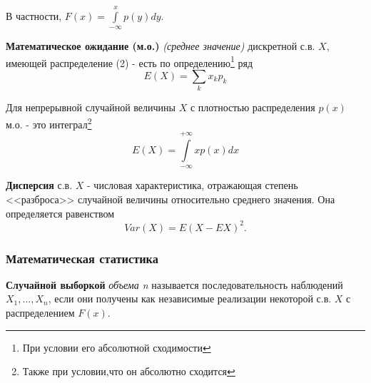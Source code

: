 \documentclass{article}
\begin{document}
      В частности, $F(x) = \int\limits_{-\infty}^x p(y)dy$.  
     
      \textbf{Математическое ожидание (м.о.)} \textsl{(среднее значение)} дискретной с.в. $X$, имеющей распределение (2) - есть по определению\footnote{При условии его абсолютной сходимости} ряд
      \begin{equation}
        E(X) = \sum\limits_k x_kp_k
      \end{equation}
      \par
      
      Для непрерывной случайной величины $X$ с плотностью распределения $p(x)$ м.о. - это интеграл\footnote{Также при условии,что он абсолютно сходится}
      \begin{equation}
        E(X) = \int\limits_{-\infty}^{+\infty} xp(x)dx
      \end{equation}
      
      \textbf{Дисперсия} с.в. $X$ - числовая характеристика, отражающая степень <<разброса>> случайной величины относительно среднего значения. Она определяется равенством
      \begin{equation}
        Var(X) = E(X - EX)^2.
      \end{equation}\par
  
    \subsubsection{Математическая статистика}
      
      \textbf{Случайной выборкой} \textsl{объема n} называется последовательность наблюдений $X_1, \ldots , X_n$, если они получены как независимые реализации некоторой с.в. $X$ с распределением $F(x)$.
      
\end{document}
